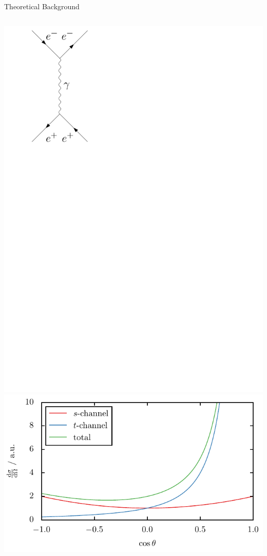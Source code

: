 \documentclass[11pt,xcolor=dvipsnames,professionalfonts]{beamer}
\begin{document}
\begin{frame}{Theoretical Background}
\begin{columns}
		\includegraphics[width=.8\textwidth]{./figures/theory/feynman/t_gamma}
		\centering
		\vspace{8pt}
		\includegraphics[width=\textwidth]{./talkfigs/pdf/s_t_channel}
	\end{columns}
\end{frame}
\end{document}
